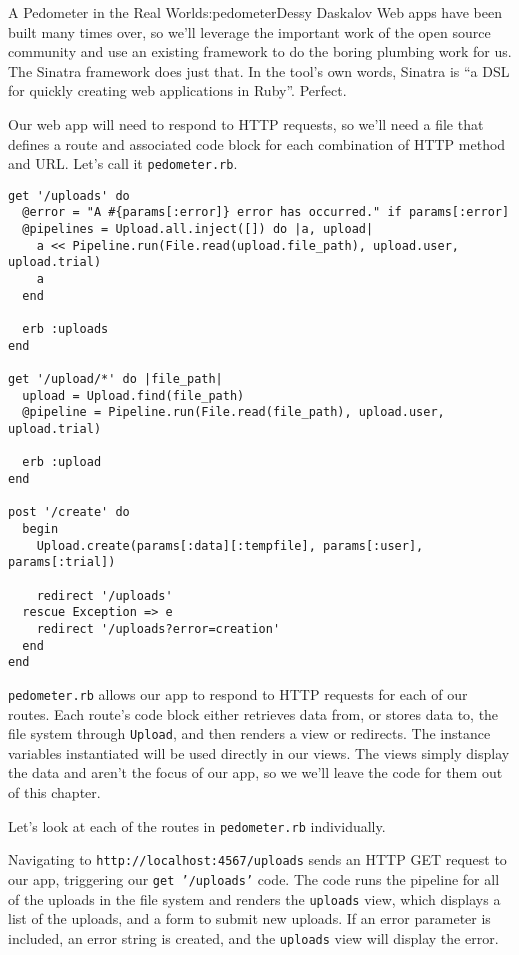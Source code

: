 \begin{aosachapter}{A Pedometer in the Real World}{s:pedometer}{Dessy Daskalov}
Web apps have been built many times over, so we'll leverage the
important work of the open source community and use an existing
framework to do the boring plumbing work for us. The Sinatra framework
does just that. In the tool's own words, Sinatra is ``a DSL for quickly
creating web applications in Ruby''. Perfect.

Our web app will need to respond to HTTP requests, so we'll need a file
that defines a route and associated code block for each combination of
HTTP method and URL. Let's call it \texttt{pedometer.rb}.

\begin{verbatim}
get '/uploads' do
  @error = "A #{params[:error]} error has occurred." if params[:error]
  @pipelines = Upload.all.inject([]) do |a, upload|
    a << Pipeline.run(File.read(upload.file_path), upload.user, upload.trial)
    a
  end

  erb :uploads
end

get '/upload/*' do |file_path|
  upload = Upload.find(file_path)
  @pipeline = Pipeline.run(File.read(file_path), upload.user, upload.trial)

  erb :upload
end

post '/create' do
  begin
    Upload.create(params[:data][:tempfile], params[:user], params[:trial])

    redirect '/uploads'
  rescue Exception => e
    redirect '/uploads?error=creation'
  end
end
\end{verbatim}

\texttt{pedometer.rb} allows our app to respond to HTTP requests for
each of our routes. Each route's code block either retrieves data from,
or stores data to, the file system through \texttt{Upload}, and then
renders a view or redirects. The instance variables instantiated will be
used directly in our views. The views simply display the data and aren't
the focus of our app, so we we'll leave the code for them out of this
chapter.

Let's look at each of the routes in \texttt{pedometer.rb} individually.

\label{get-uploads}

Navigating to \texttt{http://localhost:4567/uploads} sends an HTTP GET
request to our app, triggering our \texttt{get '/uploads'} code. The
code runs the pipeline for all of the uploads in the file system and
renders the \texttt{uploads} view, which displays a list of the uploads,
and a form to submit new uploads. If an error parameter is included, an
error string is created, and the \texttt{uploads} view will display the
error.


\end{aosachapter}
